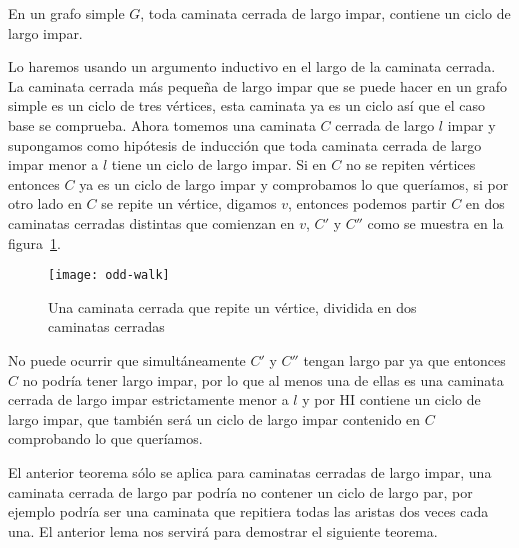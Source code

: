 \begin{lema}\label{teo:odd-walk}
En un grafo simple $G$, toda caminata cerrada de largo impar, contiene un ciclo de largo impar.

\begin{demostracion}
Lo haremos usando un argumento inductivo en el largo de la caminata cerrada.
La caminata cerrada más pequeña de largo impar que se puede hacer en un grafo simple es un ciclo de tres vértices, esta caminata ya es un ciclo así que el caso base se comprueba.
Ahora tomemos una caminata $C$ cerrada de largo $l$ impar y supongamos como hipótesis de inducción que toda caminata cerrada de largo impar menor a $l$ tiene un ciclo de largo impar.
Si en $C$ no se repiten vértices entonces $C$ ya es un ciclo de largo impar y comprobamos lo que queríamos, si por otro lado en $C$ se repite un vértice, digamos $v$, entonces podemos partir $C$ en dos caminatas cerradas distintas que comienzan en $v$, $C'$ y $C''$ como se muestra en la figura~\ref{fig:odd-walk}.
\begin{figure}[h!]
\centering
\texttt{[image: odd-walk]}
\caption{Una caminata cerrada que repite un vértice, dividida en dos caminatas cerradas}
\label{fig:odd-walk}
\end{figure}
No puede ocurrir que simultáneamente $C'$ y $C''$ tengan largo par ya que entonces $C$ no podría tener largo impar, por lo que al menos una de ellas es una caminata cerrada de largo impar estrictamente menor a $l$ y por HI contiene un ciclo de largo impar, que también será un ciclo de largo impar contenido en $C$ comprobando lo que queríamos.
\end{demostracion}
\end{lema}

El anterior teorema sólo se aplica para caminatas cerradas de largo impar, una caminata cerrada de largo par podría no contener un ciclo de largo par, por ejemplo podría ser una caminata que repitiera todas las aristas dos veces cada una.
El anterior lema nos servirá para demostrar el siguiente teorema.

